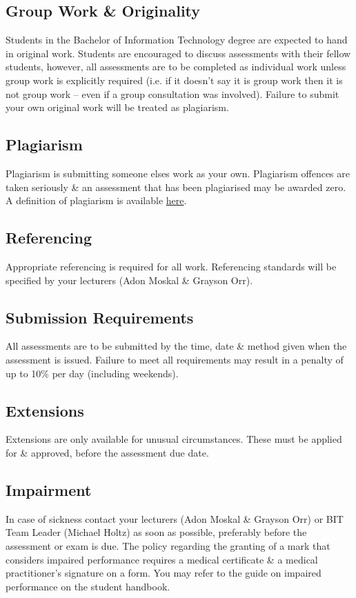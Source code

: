 \documentclass{article}
\begin{document}
\subsection*{Group Work \& Originality}
Students in the Bachelor of Information Technology degree are expected to hand in original work. Students are encouraged to discuss assessments with their fellow students, however, all assessments are to be completed as individual work unless group work is explicitly required (i.e. if it doesn’t say it is group work then it is not group work – even if a group consultation was involved). Failure to submit your own original work will be treated as plagiarism.

\subsection*{Plagiarism}
Plagiarism is submitting someone elses work as your own. Plagiarism offences are taken seriously \& an assessment that has been plagiarised may be awarded zero. A definition of plagiarism is available \href{https://studentservices.op.ac.nz/learning-support/academic-integrity/}{here}.

\subsection*{Referencing}
Appropriate referencing is required for all work. Referencing standards will be specified by your lecturers (Adon Moskal \& Grayson Orr).

\subsection*{Submission Requirements}
All assessments are to be submitted by the time, date \& method given when the assessment is issued. Failure to meet all requirements may result in a penalty of up to 10\% per day (including weekends).

\subsection*{Extensions}
Extensions are only available for unusual circumstances. These must be applied for \& approved, before the assessment due date. 

\subsection*{Impairment}
In case of sickness contact your lecturers (Adon Moskal \& Grayson Orr) or BIT Team Leader (Michael Holtz) as soon as possible, preferably before the assessment or exam is due. The policy regarding the granting of a mark that considers impaired performance requires a medical certificate \& a medical practitioner’s signature on a form. You may refer to the guide on impaired performance on the student handbook.
\end{document}
